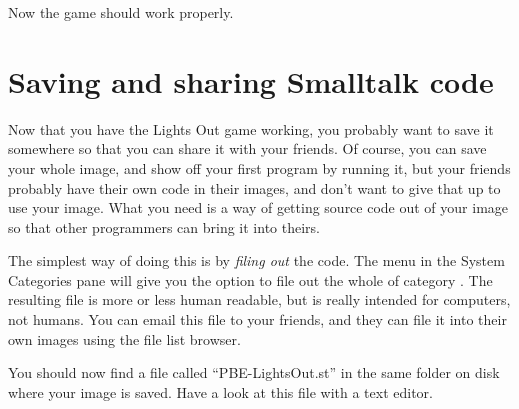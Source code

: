 \documentclass[a4paper,10pt,twoside]{book}
\begin{document}

Now the game should work properly.


\section{Saving and sharing Smalltalk code}
\label{sec:Monticello}

Now that you have the Lights Out game working, you probably want to save it somewhere so that you can share it with your friends. Of course, you can save your whole \pharo image, and show off your first program by running it, but your friends probably have their own code in their images, and don't want to give that up to use your image.
What you need is a way of getting source code out of your \pharo image so that other programmers can bring it into theirs.

The simplest way of doing this is by \emph{filing out} the code.  The \actclick menu in the System Categories pane will give you the option to file out the whole of category .
The resulting file is more or less human readable, but is really intended for computers, not humans.
You can email this file to your friends, and they can file it into their own \pharo images using the file list browser.

You should now find a file called ``PBE-LightsOut.st'' in the same folder on disk where your image is saved.
Have a look at this file with a text editor.

\end{document}
